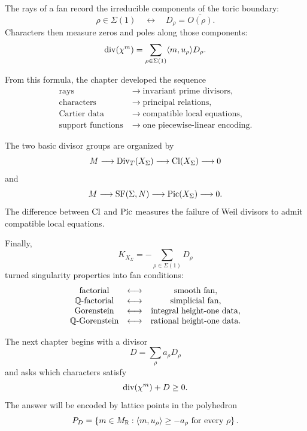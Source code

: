 The rays of a fan record the irreducible components of the toric
boundary:
\[
\rho\in\Sigma(1)
\quad\longleftrightarrow\quad
D_\rho=\overline{O(\rho)}.
\]
Characters then measure zeros and poles along those components:
\[
\operatorname{div}(\chi^{m})
=
\sum_{\rho\in\Sigma(1)}
\langle m,u_\rho\rangle D_\rho.
\]

From this formula, the chapter developed the sequence
\[
\boxed{
\begin{aligned}
\text{rays}
&\longrightarrow
\text{invariant prime divisors},
\\
\text{characters}
&\longrightarrow
\text{principal relations},
\\
\text{Cartier data}
&\longrightarrow
\text{compatible local equations},
\\
\text{support functions}
&\longrightarrow
\text{one piecewise-linear encoding}.
\end{aligned}
}
\]

The two basic divisor groups are organized by
\[
M
\longrightarrow
\operatorname{Div}_T(X_\Sigma)
\longrightarrow
\operatorname{Cl}(X_\Sigma)
\longrightarrow0
\]
and
\[
M
\longrightarrow
\operatorname{SF}(\Sigma,N)
\longrightarrow
\operatorname{Pic}(X_\Sigma)
\longrightarrow0.
\]
The difference between \(\operatorname{Cl}\) and
\(\operatorname{Pic}\) measures the failure of Weil divisors to admit
compatible local equations.

Finally,
\[
K_{X_\Sigma}
=
-\sum_{\rho\in\Sigma(1)}D_\rho
\]
turned singularity properties into fan conditions:
\[
\begin{array}{c@{\quad\longleftrightarrow\quad}c}
\text{factorial}
&
\text{smooth fan},
\\
\Qfactorial
&
\text{simplicial fan},
\\
\text{Gorenstein}
&
\text{integral height-one data},
\\
\QGorenstein
&
\text{rational height-one data}.
\end{array}
\]

The next chapter begins with a divisor
\[
D=\sum_\rho a_\rho D_\rho
\]
and asks which characters satisfy
\[
\operatorname{div}(\chi^{m})+D\geq0.
\]
The answer will be encoded by lattice points in the polyhedron
\[
P_D
=
\left\{
m\in M_{\mathbb{R}}:
\langle m,u_\rho\rangle\geq-a_\rho
\text{ for every }\rho
\right\}.
\]

